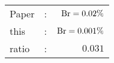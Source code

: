       \begin{tabular}{lcr}
          Paper &:& $\mathrm{Br}  = 0.02\%$ \\
          this      &:& $\mathrm{Br}  = 0.001\%$ \\
		  ratio   &:& $0.031$ \\
      \end{tabular}
